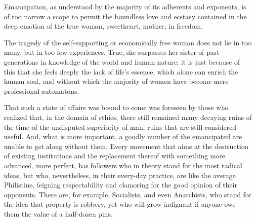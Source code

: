 Emancipation, as understood by the majority of its adherents and
exponents, is of too narrow a scope to permit the boundless love and
ecstasy contained in the deep emotion of the true woman, sweetheart,
mother, in freedom.

The tragedy of the self-supporting or economically free woman does not
lie in too many, but in too few experiences. True, she surpasses her
sister of past generations in knowledge of the world and human
 nature; it is just because of this that she feels deeply
the lack of life's essence, which alone can enrich the human soul, and
without which the majority of women have become mere professional
automatons.

That such a state of affairs was bound to come was foreseen by those
who realized that, in the domain of ethics, there still remained many
decaying ruins of the time of the undisputed superiority of man; ruins
that are still considered useful. And, what is more important, a
goodly number of the emancipated are unable to get along without them.
Every movement that aims at the destruction of existing institutions
and the replacement thereof with something more advanced, more
perfect, has followers who in theory stand for the most radical ideas,
but who, nevertheless, in their every-day practice, are like the
average Philistine, feigning respectability and clamoring for the good
opinion of their opponents. There are, for example, Socialists, and
even Anarchists, who stand for the idea that property is robbery, yet
who will grow indignant if anyone owe them the value of a half-dozen
pins.

